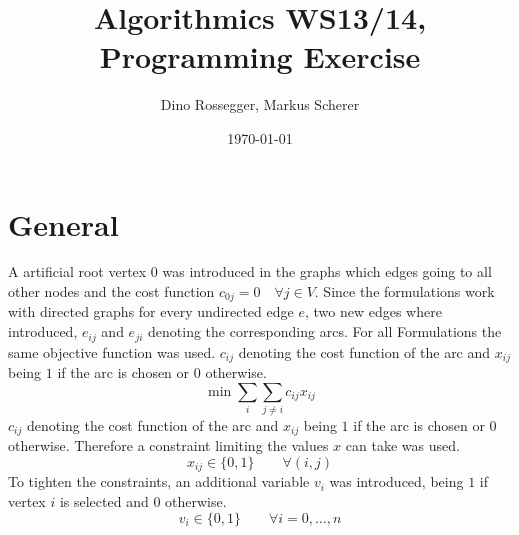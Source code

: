 \documentclass[a4paper]{article}
\title{Algorithmics WS13/14, Programming Exercise}
\author{Dino Rossegger, Markus Scherer}
\date{\today}
\numberwithin{equation}{section}
\begin{document}
\maketitle
\section{General}
A artificial root vertex $0$ was introduced in the graphs which edges going to all other nodes and the cost function $c_{0j}=0\quad \forall j\in V$. Since the formulations work with directed graphs for every undirected edge $e$, two new edges where introduced, $e_{ij}$ and $e_{ji}$ denoting the corresponding arcs.
For all Formulations the same objective function was used. $c_{ij}$ denoting the cost function of the arc and $x_{ij}$ being $1$ if the arc is chosen or $0$ otherwise.
\begin{equation}
	\min{\sum_i \sum_{j\not=i} c_{ij}x_{ij}}
\end{equation} 
$c_{ij}$ denoting the cost function of the arc and $x_{ij}$ being $1$ if the arc is chosen or $0$ otherwise. Therefore a constraint limiting the values $x$ can take was used.
\begin{equation}
	x_{ij} \in \{0,1\} \qquad \forall (i,j)
\end{equation}
To tighten the constraints, an additional variable $v_i$ was introduced, being $1$ if vertex $i$ is selected and $0$ otherwise.
\begin{equation}
	v_i \in\{0,1\} \qquad \forall i=0,\dots,n
\end{equation}
\end{document}
